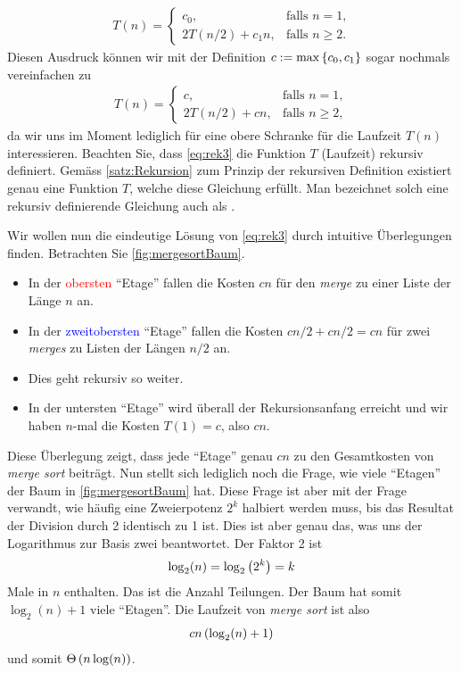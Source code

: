 \begin{align}\label{eq:rek2}
  T(n) = 
  \begin{cases}
    c_0, &\text{falls $n = 1$,} \\
    2T(n/2) + c_1n, & \text{falls $n\geq 2$}.
  \end{cases}
\end{align}
Diesen Ausdruck können wir mit der Definition $c := \max\left\{c_0,c_1\right\}$ sogar nochmals vereinfachen zu
\begin{align}\label{eq:rek3}
  T(n) = 
  \begin{cases}
    c, &\text{falls $n = 1$,} \\
    2T(n/2) + cn, & \text{falls $n\geq 2$},
  \end{cases}
\end{align}
da wir uns im Moment lediglich für eine obere Schranke für die Laufzeit $T(n)$ interessieren. Beachten Sie, dass \cref{eq:rek3} die Funktion $T$ (Laufzeit) rekursiv definiert. Gemäss \cref{satz:Rekursion} zum Prinzip der rekursiven Definition existiert genau eine Funktion $T$, welche diese Gleichung erfüllt. Man bezeichnet solch eine rekursiv definierende Gleichung auch als . 

Wir wollen nun die eindeutige Lösung von \cref{eq:rek3} durch intuitive Überlegungen finden. Betrachten Sie \cref{fig:mergesortBaum}.
\begin{itemize}
  \item In der \textcolor{Red}{obersten} \enquote{Etage} fallen die Kosten $cn$ für den \textit{merge} zu einer Liste der Länge $n$ an.
  \item In der \textcolor{Blue}{zweitobersten} \enquote{Etage} fallen die Kosten $cn/2 + cn/2 = cn$ für zwei \textit{merges} zu Listen der Längen $n/2$ an.
  \item Dies geht rekursiv so weiter.
  \item In der untersten \enquote{Etage} wird überall der Rekursionsanfang erreicht und wir haben $n$-mal die Kosten $T(1) = c$, also $cn$.
\end{itemize}
Diese Überlegung zeigt, dass jede \enquote{Etage} genau $cn$ zu den Gesamtkosten von \textit{merge sort} beiträgt. Nun stellt sich lediglich noch die Frage, wie viele \enquote{Etagen} der Baum in \cref{fig:mergesortBaum} hat. Diese Frage ist aber mit der Frage verwandt, wie häufig eine Zweierpotenz $2^k$ halbiert werden muss, bis das Resultat der Division durch 2 identisch zu 1 ist. Dies ist aber genau das, was uns der Logarithmus zur Basis zwei beantwortet. Der Faktor 2 ist
\begin{align*}
  \log_2(n) = \log_2\left(2^k\right) = k
\end{align*}
Male in $n$ enthalten. Das ist die Anzahl Teilungen. Der Baum hat somit $\log_2(n) + 1$ viele \enquote{Etagen}. Die Laufzeit von \textit{merge sort} ist also
\begin{align*}
  cn\left(\log_2(n) + 1\right)
\end{align*}
und somit $\Theta\left(n\log(n)\right)$.

